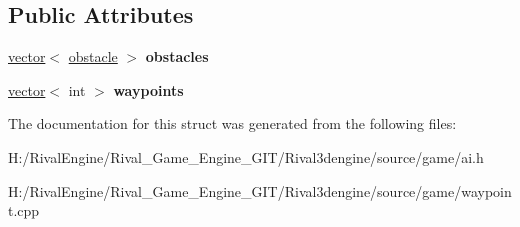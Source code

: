 \subsection*{Public Attributes}
\begin{DoxyCompactItemize}
\item 
\mbox{\label{structai_1_1avoidset_a9b5225a30f36557c4709557046c6f1a1}} 
\hyperlink{structvector}{vector}$<$ \hyperlink{structai_1_1avoidset_1_1obstacle}{obstacle} $>$ {\bfseries obstacles}
\item 
\mbox{\label{structai_1_1avoidset_acff4374fee025b6375ce76a19e3dd9e5}} 
\hyperlink{structvector}{vector}$<$ int $>$ {\bfseries waypoints}
\end{DoxyCompactItemize}


The documentation for this struct was generated from the following files\+:\begin{DoxyCompactItemize}
\item 
H\+:/\+Rival\+Engine/\+Rival\+\_\+\+Game\+\_\+\+Engine\+\_\+\+G\+I\+T/\+Rival3dengine/source/game/ai.\+h\item 
H\+:/\+Rival\+Engine/\+Rival\+\_\+\+Game\+\_\+\+Engine\+\_\+\+G\+I\+T/\+Rival3dengine/source/game/waypoint.\+cpp\end{DoxyCompactItemize}
